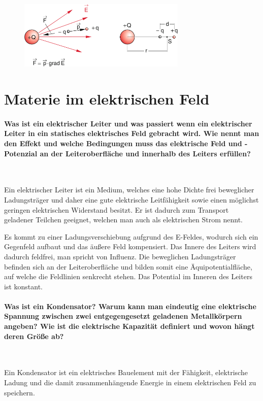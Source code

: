\documentclass[a4paper, 11pt, parskip=half]{scrartcl}
\begin{document}
\begin{figure}[H]
    \centering
    \includegraphics[width=8cm]{image/1/14}
\end{figure}

\newpage

\section{Materie im elektrischen Feld}

\paragraph{Was ist ein elektrischer Leiter und was passiert wenn ein elektrischer Leiter in ein
statisches elektrisches Feld gebracht wird. Wie nennt man den Effekt und welche Bedingungen muss das
elektrische Feld und -Potenzial an der Leiteroberfläche und innerhalb des Leiters erfüllen?} ~

Ein elektrischer Leiter ist ein Medium, welches eine hohe Dichte frei beweglicher Ladungsträger und
daher eine gute elektrische Leitfähigkeit sowie einen möglichst geringen elektrischen Widerstand
besitzt. Er ist dadurch zum Transport geladener Teilchen geeignet, welchen man auch als elektrischen
Strom nennt.

Es kommt zu einer Ladungsverschiebung aufgrund des E-Feldes, wodurch sich ein Gegenfeld aufbaut und
das äußere Feld kompensiert. Das Innere des Leiters wird dadurch feldfrei, man spricht von Influenz.
Die beweglichen Ladungsträger befinden sich an der Leiteroberfläche und bilden somit eine
Äquipotentialfläche, auf welche die Feldlinien senkrecht stehen. Das Potential im Inneren des
Leiters ist konstant.

\paragraph{Was ist ein Kondensator? Warum kann man eindeutig eine elektrische Spannung zwischen zwei
entgegengesetzt geladenen Metallkörpern angeben? Wie ist die elektrische Kapazität definiert und
wovon hängt deren Größe ab?} ~

Ein Kondensator ist ein elektrisches Bauelement mit der Fähigkeit, elektrische Ladung und die damit
zusammenhängende Energie in einem elektrischen Feld zu speichern.
\end{document}

